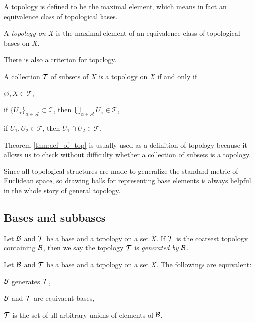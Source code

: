 \documentclass{../crs}
\begin{document}
A topology is defined to be the maximal element, which means in fact an equivalence class of topological bases.

\begin{defn}
A \emph{topology on $X$} is the maximal element of an equivalence class of topological bases on $X$.
\end{defn}

There is also a criterion for topology.

\begin{thm}\label{thm:def_of_top}
A collection $\mathcal{T}$ of subsets of $X$ is a topology on $X$ if and only if
\begin{cond}
\item $\varnothing,X\in\mathcal{T}$,
\item if $\{U_\alpha\}_{\alpha\in\mathcal{A}}\subset\mathcal{T}$, then $\bigcup_{\alpha\in\mathcal{A}}U_\alpha\in\mathcal{T}$,
\item if $U_1,U_2\in\mathcal{T}$, then $U_1\cap U_2\in\mathcal{T}$.
\end{cond}
\end{thm}
\begin{pf}
\end{pf}
Theorem \ref{thm:def_of_top} is usually used as a definition of topology because it allows us to check without difficulty whether a collection of subsets is a topology.


Since all topological structures are made to generalize the standard metric of Euclidean space, so drawing balls for representing base elements is always helpful in the whole story of general topology.






\subsection{Bases and subbases}

\begin{defn}
Let $\mathcal{B}$ and $\mathcal{T}$ be a base and a topology on a set $X$.
If $\mathcal{T}$ is the coarsest topology containing $\mathcal{B}$, then we say the topology $\mathcal{T}$ is \emph{generated by} $\mathcal{B}$.
\end{defn}
\begin{thm}
Let $\mathcal{B}$ and $\mathcal{T}$ be a base and a topology on a set $X$.
The followings are equivalent:
\begin{cond}
\item $\mathcal{B}$ generates $\mathcal{T}$,
\item $\mathcal{B}$ and $\mathcal{T}$ are equivaent bases,
\item $\mathcal{T}$ is the set of all arbitrary unions of elements of $\mathcal{B}$.
\end{cond}
\end{thm}
\end{document}
